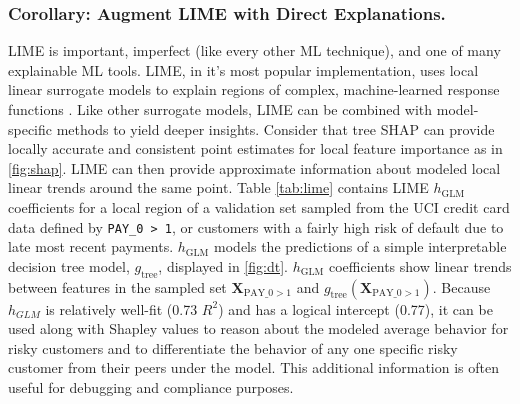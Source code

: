 \documentclass[sigconf]{acmart}
\begin{document}
\subsubsection{Corollary: Augment LIME with Direct Explanations.} LIME is important, imperfect (like every other ML technique), and one of many explainable ML tools. LIME, in it's most popular implementation, uses local linear surrogate models to explain regions of complex, machine-learned response functions \cite{lime}. Like other surrogate models, LIME can be combined with model-specific methods to yield deeper insights. Consider that tree SHAP can provide locally accurate and consistent point estimates for local feature importance as in \ref{fig:shap}. LIME can then provide approximate information about modeled local linear trends around the same point. Table \ref{tab:lime} contains LIME $h_{\text{GLM}}$ coefficients for a local region of a validation set sampled from the UCI credit card data defined by \texttt{PAY\_0 > 1}, or customers with a fairly high risk of default due to late most recent payments.  $h_{\text{GLM}}$ models the predictions of a simple interpretable decision tree model, $g_{\text{tree}}$, displayed in \ref{fig:dt}. $h_{\text{GLM}}$ coefficients show linear trends between features in the sampled set $\mathbf{X}_{\text{PAY\_0} > 1}$ and $g_{\text{tree}}(\mathbf{X}_{\text{PAY\_0}> 1})$. Because $h_{GLM}$ is relatively well-fit (0.73 $R^2$) and has a logical intercept (0.77), it can be used along with Shapley values to reason about the modeled average behavior for risky customers and to differentiate the behavior of any one specific risky customer from their peers under the model. This additional information is often useful for debugging and compliance purposes.
\end{document}
